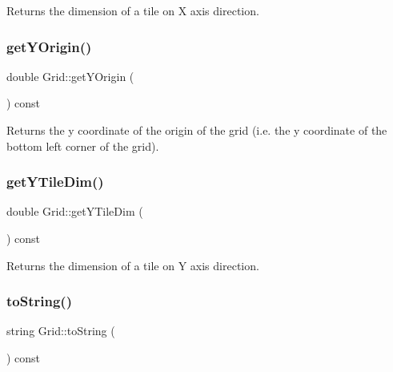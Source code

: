 \begin{DoxyReturn}{Returns}
the dimension of a tile on X axis direction. 
\end{DoxyReturn}
\mbox{\label{class_grid_a53141770920cf261579cf164a8909af9}} 
\subsubsection{\texorpdfstring{get\+Y\+Origin()}{getYOrigin()}}
{\footnotesize\ttfamily double Grid\+::get\+Y\+Origin (\begin{DoxyParamCaption}{ }\end{DoxyParamCaption}) const}

\begin{DoxyReturn}{Returns}
the y coordinate of the origin of the grid (i.\+e. the y coordinate of the bottom left corner of the grid). 
\end{DoxyReturn}
\mbox{\label{class_grid_aedfe477f5be79a375bd64a4d21765918}} 
\subsubsection{\texorpdfstring{get\+Y\+Tile\+Dim()}{getYTileDim()}}
{\footnotesize\ttfamily double Grid\+::get\+Y\+Tile\+Dim (\begin{DoxyParamCaption}{ }\end{DoxyParamCaption}) const}

\begin{DoxyReturn}{Returns}
the dimension of a tile on Y axis direction. 
\end{DoxyReturn}
\mbox{\label{class_grid_ad48d195b5e333a94a3a14d6395252b2a}} 
\subsubsection{\texorpdfstring{to\+String()}{toString()}}
{\footnotesize\ttfamily string Grid\+::to\+String (\begin{DoxyParamCaption}{ }\end{DoxyParamCaption}) const\hspace{0.3cm}{\ttfamily [private]}}

